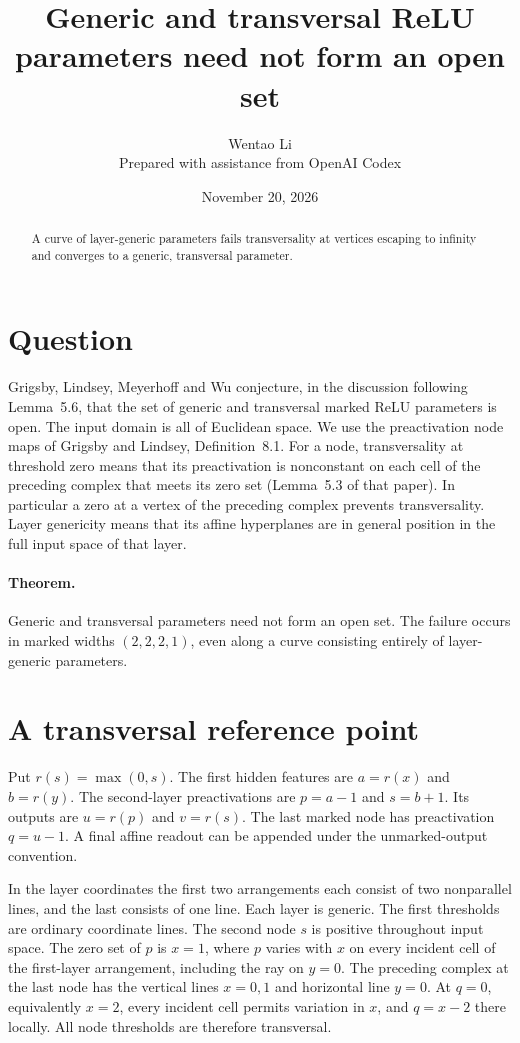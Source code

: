 \documentclass[11pt]{article}
\title{Generic and transversal ReLU parameters need not form an open set}
\author{Wentao Li\\{\small Prepared with assistance from OpenAI Codex}}
\date{November 20, 2026}
\begin{document}
\maketitle
\begin{abstract}
A curve of layer-generic parameters fails transversality at vertices escaping to infinity and converges to a generic, transversal parameter.
\end{abstract}
\section*{Question}
Grigsby, Lindsey, Meyerhoff and Wu conjecture, in the discussion following Lemma~5.6, that the set of generic and transversal marked ReLU parameters is open. The input domain is all of Euclidean space. We use the preactivation node maps of Grigsby and Lindsey, Definition~8.1. For a node, transversality at threshold zero means that its preactivation is nonconstant on each cell of the preceding complex that meets its zero set (Lemma~5.3 of that paper). In particular a zero at a vertex of the preceding complex prevents transversality. Layer genericity means that its affine hyperplanes are in general position in the full input space of that layer.

\paragraph{Theorem.} Generic and transversal parameters need not form an open set. The failure occurs in marked widths $(2,2,2,1)$, even along a curve consisting entirely of layer-generic parameters.

\section*{A transversal reference point}
Put $r(s)=\max(0,s)$. The first hidden features are $a=r(x)$ and $b=r(y)$. The second-layer preactivations are $p=a-1$ and $s=b+1$. Its outputs are $u=r(p)$ and $v=r(s)$. The last marked node has preactivation $q=u-1$. A final affine readout can be appended under the unmarked-output convention.

In the layer coordinates the first two arrangements each consist of two nonparallel lines, and the last consists of one line. Each layer is generic. The first thresholds are ordinary coordinate lines. The second node $s$ is positive throughout input space. The zero set of $p$ is $x=1$, where $p$ varies with $x$ on every incident cell of the first-layer arrangement, including the ray on $y=0$. The preceding complex at the last node has the vertical lines $x=0,1$ and horizontal line $y=0$. At $q=0$, equivalently $x=2$, every incident cell permits variation in $x$, and $q=x-2$ there locally. All node thresholds are therefore transversal.
\end{document}
